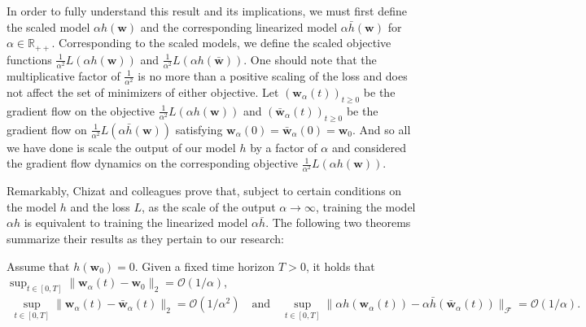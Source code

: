 \documentclass{article}
\newenvironment{manualtheorem}[1]{%
  \renewcommand\themanualtheoreminner{#1}%
  \manualtheoreminner
}{\endmanualtheoreminner}
\begin{document}
In order to fully understand this result and its implications, we must first define the scaled model $\alpha h(\boldsymbol{w})$ and the corresponding linearized model $\alpha \bar{h}(\boldsymbol{w})$ for $\alpha \in \mathbb{R}_{++}$. Corresponding to the scaled models, we define the scaled objective functions $\frac{1}{\alpha^2}L(\alpha h(\boldsymbol{w}))$ and $\frac{1}{\alpha^2}L(\alpha h(\boldsymbol{\bar{w}}))$. One should note that the multiplicative factor of $\frac{1}{\alpha^2}$ is no more than a positive scaling of the loss and does not affect the set of minimizers of either objective. Let $(\boldsymbol{w}_{\alpha}(t))_{t \geq 0}$ be the gradient flow on the objective $\frac{1}{\alpha^2}L(\alpha h(\boldsymbol{w}))$ and $(\boldsymbol{\bar{w}}_{\alpha}(t))_{t \geq 0}$ be the gradient flow on $\frac{1}{\alpha^2}L(\alpha \bar{h}(\boldsymbol{w}))$ satisfying $\boldsymbol{w}_{\alpha}(0) = \boldsymbol{\bar{w}}_{\alpha}(0) = \boldsymbol{w}_0$. And so all we have done is scale the output of our model $h$ by a factor of $\alpha$ and considered the gradient flow dynamics on the corresponding objective $\frac{1}{\alpha^2}L(\alpha h(\boldsymbol{w}))$.

Remarkably, Chizat and colleagues prove that, subject to certain conditions on the model $h$ and the loss $L$, as the scale of the output $\alpha \rightarrow \infty$, training the model $\alpha h$ is equivalent to training the linearized model $\alpha \bar{h}$. The following two theorems summarize their results as they pertain to our research:

\begin{manualtheorem}{2.2}[from \cite{chizat2019lazy}]\label{Chizatthm2.2}
Assume that $h(\boldsymbol{w}_0) = 0$. Given a fixed time horizon $T > 0$, it holds that $\sup_{t \in [0, T]} \| \boldsymbol{w}_{\alpha}(t) - \boldsymbol{w}_0 \|_2 = \mathcal{O}(1/\alpha)$,
\begin{align*}
    \sup_{t \in [0, T]} \| \boldsymbol{w}_{\alpha}(t) - \boldsymbol{\bar{w}}_{\alpha}(t) \|_2 = \mathcal{O}(1/\alpha^2) \quad \text{and} \quad \sup_{t \in [0, T]} \| \alpha h(\boldsymbol{w}_{\alpha}(t)) - \alpha \bar{h}(\boldsymbol{\bar{w}}_{\alpha}(t)) \|_{\mathcal{F}} = \mathcal{O}(1/\alpha).
\end{align*}
\end{manualtheorem}
\end{document}
